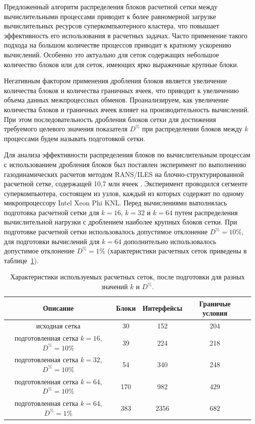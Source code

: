 Предложенный алгоритм распределения блоков расчетной сетки между вычислительными процессами приводит к более равномерной загрузке вычислительных ресурсов суперкомпьютерного кластера, что повышает эффективность его использования в расчетных задачах.
Часто применение такого подхода на большом количестве процессов приводит к кратному ускорению вычислений.
Особенно это актуально для сеток содержащих небольшое количество блоков или для сеток, имеющих ярко выраженные крупные блоки.

Негативным фактором применения дробления блоков является увеличение количества блоков и количества граничных ячеек, что приводит к увеличению объема данных межпроцессных обменов.
Проанализируем, как увеличение количества блоков и граничных ячеек влияет на производительность вычислений.
При этом последовательность дробления блоков сетки для достижения требуемого целевого значения показателя $D^{\%}$ при распределении блоков между $k$ процессами будем называть подготовкой сетки.

Для анализа эффективности распределения блоков по вычислительным процессам с использованием дробления блоков был поставлен эксперимент по выполнению газодинамических расчетов методом RANS/ILES на блочно-структурированной расчетной сетке, содержащей 10,7 млн ячеек \cite{Savin2019RANS}.
Эксперимент проводился сегменте суперкомпьютера, состоящем из узлов, каждый из которых содержит по одному микропроцессору Intel Xeon Phi KNL.
Перед вычислениями выполнялась подготовка расчетной сетки для $k = 16$, $k = 32$ и $k = 64$ путем распределения вычислительной нагрузки с дроблением наиболее крупных блоков сетки.
При подготовке расчетной сетки использовалось допустимое отклонение $D^{\%} = 10\%$, для подготовки вычислений для $k = 64$ дополнительно использовалось допустимое отклонение $D^{\%} = 1\%$ (характеристики расчетных сеток приведены в таблице~\ref{tbl:text_2_withcut}).

\begin{table}[!ht]
\centering
\singlespacing
{}\caption{Характеристики используемых расчетных сеток, после подготовки для разных значений $k$ и $D^{\%}$.}
\bigskip
\label{tbl:text_2_withcut}
\begin{tabular}{ | c | c | c | c | c | }
  \hline
  Описание & Блоки & Интерфейсы & Граничые условия \\ \hline\hline
  исходная сетка & 30 & 152 & 204 \\ \hline\hline
  \makecell{подготовленная сетка \\ $k = 16$, $D^{\%} = 10\%$} & 39 & 224 & 218 \\ \hline
  \makecell{подготовленная сетка \\ $k = 32$, $D^{\%} = 10\%$} & 54 & 340 & 248 \\ \hline
  \makecell{подготовленная сетка \\ $k = 64$, $D^{\%} = 10\%$} & 170 & 982 & 429 \\ \hline\hline
  \makecell{подготовленная сетка \\ $k = 64$, $D^{\%} = 1\%$} & 383 & 2356 & 682 \\ \hline
\end{tabular}
\end{table}

